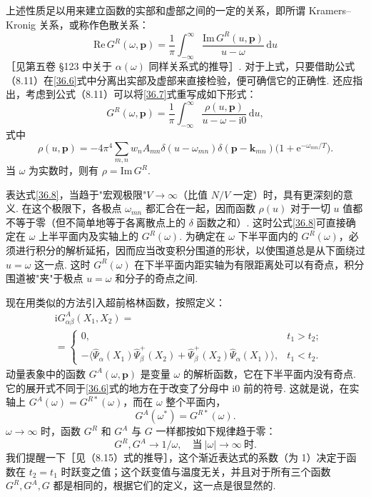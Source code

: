 上述性质足以用来建立函数的实部和虚部之间的一定的关系，即所谓 Kramers--Kronig 关系，或称作{\heiti 色散关系}：
\begin{equation}
\mathrm{Re}\,G^{R}(\omega,\bm p)=\frac{1}{\pi}\int_{-\infty}^{\infty}
\frac{\mathrm{Im}\,G^{R}(u,\bm p)}{u-\omega}\,\mathrm{d}u
\label{36.7}
\end{equation}
［见第五卷 §123 中关于 $\alpha(\omega)$ 同样关系式的推导］. 对于上式，只要借助公式（8.11）在\eqref{36.6}式中分离出实部及虚部来直接检验，便可确信它的正确性. 还应指出，考虑到公式（8.11）可以将\eqref{36.7}式重写成如下形式：
\begin{equation}
G^{R}(\omega,\bm p)=\frac{1}{\pi}\int_{-\infty}^{\infty}
\frac{\rho(u,\bm p)}{u-\omega-\mathrm{i}0}\,\mathrm{d}u,
\label{36.8}
\end{equation}
式中
\begin{equation*}
\rho(u,\bm p)=-4\pi^{4}\sum_{m,n}w_n A_{mn}\delta(u-\omega_{mn})\delta(\bm p-\bm k_{mn})
\bigl(1+\mathrm{e}^{-\omega_{mn}/T}\bigr).
\end{equation*}
当 $\omega$ 为实数时，则有 $\rho=\mathrm{Im}\,G^{R}$.

表达式\eqref{36.8}，当趋于"宏观极限"$V\to\infty$（比值 $N/V$ 一定）时，具有更深刻的意义. 在这个极限下，各极点 $\omega_{mn}$ 都汇合在一起，因而函数 $\rho(u)$ 对于一切 $u$ 值都不等于零（但不简单地等于各离散点上的 $\delta$ 函数之和）. 这时公式\eqref{36.8}可直接确定在 $\omega$ 上半平面内及实轴上的 $G^{R}(\omega)$. 为确定在 $\omega$ 下半平面内的 $G^{R}(\omega)$，必须进行积分的解析延拓，因而应当改变积分围道的形状，以使围道总是从下面绕过 $u=\omega$ 这一点. 这时 $G^{R}(\omega)$ 在下半平面内距实轴为有限距离处可以有奇点，积分围道被"夹"于极点 $u=\omega$ 和分子的奇点之间.

现在用类似的方法引入超前格林函数，按照定义：
\begin{equation}
\begin{aligned}
&\mathrm{i}G^{A}_{\alpha\beta}(X_1,X_2)=\\
&=\left\{\begin{array}{ll}
0, & t_1>t_2;\\[0.2em]
-\langle\hat\Psi_\alpha(X_1)\hat\Psi^{+}_\beta(X_2)+\hat\Psi^{+}_\beta(X_2)\hat\Psi_\alpha(X_1)\rangle, & t_1<t_2.
\end{array}\right.
\end{aligned}
\label{36.9}
\end{equation}
动量表象中的函数 $G^{A}(\omega,\bm p)$ 是变量 $\omega$ 的解析函数，它在下半平面内没有奇点. 它的展开式不同于\eqref{36.6}式的地方在于改变了分母中 i0 前的符号. 这就是说，在实轴上 $G^{A}(\omega)=G^{R*}(\omega)$，而在 $\omega$ 整个平面内，
\begin{equation}
G^{A}(\omega^{*})=G^{R*}(\omega).
\label{36.10}
\end{equation}
$\omega\to\infty$ 时，函数 $G^{R}$ 和 $G^{A}$ 与 $G$ 一样都按如下规律趋于零：
\begin{equation}
G^{R},G^{A}\to 1/\omega,\quad\text{当}\ |\omega|\to\infty\ \text{时}.
\label{36.11}
\end{equation}
我们提醒一下［见（8.15）式的推导］，这个渐近表达式的系数（为 1）决定于函数在 $t_2=t_1$ 时跃变之值；这个跃变值与温度无关，并且对于所有三个函数 $G^{R},G^{A},G$ 都是相同的，根据它们的定义，这一点是很显然的.

